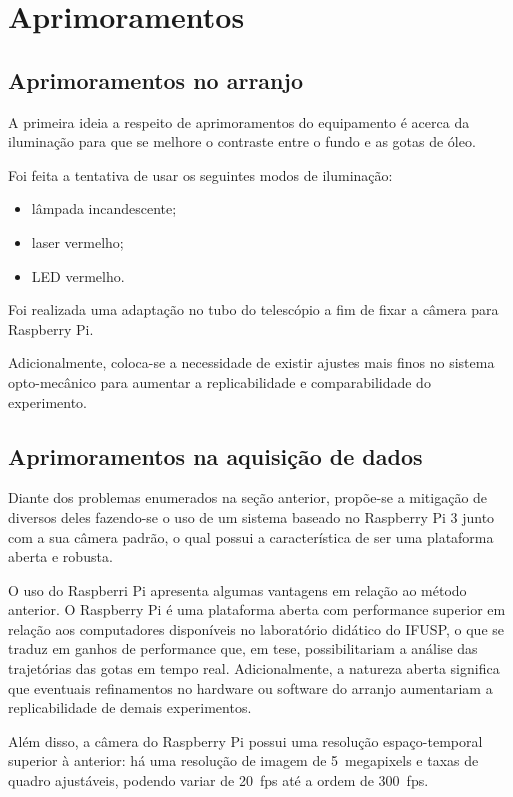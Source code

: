 \documentclass[twoside, twocolumn]{article}
\begin{document}
\section{Aprimoramentos}

\subsection{Aprimoramentos no arranjo}

A primeira ideia a respeito de aprimoramentos do equipamento é acerca da iluminação para que se melhore o contraste entre o fundo e as gotas de óleo.

Foi feita a tentativa de usar os seguintes modos de iluminação:

\begin{itemize}
	\item lâmpada incandescente;
    \item laser vermelho;
    \item LED vermelho.
\end{itemize}

Foi realizada uma adaptação no tubo do telescópio a fim de fixar a câmera para Raspberry Pi.

Adicionalmente, coloca-se a necessidade de existir ajustes mais finos no sistema opto-mecânico para aumentar a replicabilidade e comparabilidade do experimento.

\subsection{Aprimoramentos na aquisição de dados}

Diante dos problemas enumerados na seção anterior, propõe-se a mitigação de diversos deles fazendo-se o uso de um sistema baseado no Raspberry Pi 3 junto com a sua câmera padrão, o qual possui a característica de ser uma plataforma aberta e robusta.

O uso do Raspberri Pi apresenta algumas vantagens em relação ao método anterior. O Raspberry Pi é uma plataforma aberta com performance superior em relação aos computadores disponíveis no laboratório didático do IFUSP, o que se traduz em ganhos de performance que, em tese, possibilitariam a análise das trajetórias das gotas em tempo real. Adicionalmente, a natureza aberta significa que eventuais refinamentos no hardware ou software do arranjo aumentariam a replicabilidade de demais experimentos.

Além disso, a câmera do Raspberry Pi possui uma resolução espaço-temporal superior à anterior: há uma resolução de imagem de \SI{5}{megapixels} e taxas de quadro ajustáveis, podendo variar de \SI{20}{fps} até a ordem de \SI{300}{fps}.
\end{document}
